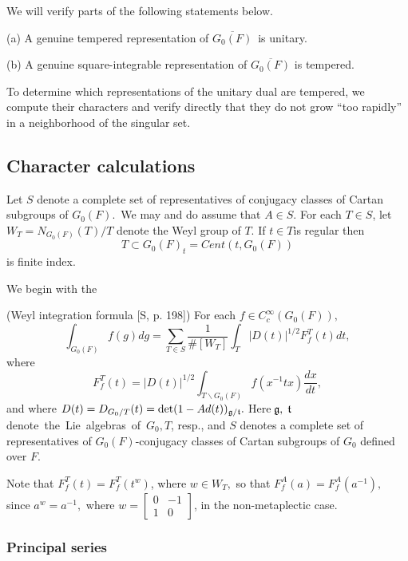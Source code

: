 We will verify parts of the following statements below.

\begin{conjecture}
(a) A genuine tempered representation of $\overline{G_0(F)}$\ is unitary.

(b) A genuine square-integrable representation of $\overline{G_0(F)}$ is
tempered.
\end{conjecture}

To determine which representations of the unitary dual are tempered, we
compute their characters and verify directly that they do not grow ``too
rapidly'' in a neighborhood of the singular set.

\subsection{Character calculations}

Let $S$ denote a complete set of representatives of conjugacy classes of
Cartan subgroups of $G_0(F)$.\ We may and do assume that $A\in S.$ For each $%
T\in S$, let $W_T=N_{G_0(F)}(T)/T$ denote the Weyl group of $T$. If $t\in T$is regular then 
\[
T\subset G_0(F)_t=Cent(t,G_0(F)) 
\]
is finite index.

We begin with the

\begin{lemma}
(Weyl integration formula [S, p. 198]) For each $f\in C_c^\infty (G_0(F)),$%
\[
\int_{G_0(F)}f(g)dg=\sum_{T\in S}\frac
1{\#[W_T]}\int_T|D(t)|^{1/2}F_f^T(t)dt,
\]
where 
\[
F_f^T(t)=|D(t)|^{1/2}\int_{T\backslash G_0(F)}f(x^{-1}tx)\frac{dx}{dt},
\]
and where $D(t)=D_{G_0/T}(t)=\det (1-Ad(t))_{{\frak g}/{\frak t}}.\;$Here$\;%
{\frak g},\;{\frak t}\;$denote\ the\ Lie\ algebras\ of\ $G_0,T$, resp., and $%
S$ denotes a complete set of representatives of $G_0(F)$-conjugacy classes
of Cartan subgroups of $G_0$ defined over $F$.
\end{lemma}

Note that $F_f^T(t)=F_f^T(t^w)$, where $w\in W_T,$ so that $%
F_f^A(a)=F_f^A(a^{-1}),$ since $a^w=a^{-1},$ where $w=\left[ 
\begin{array}{cc}
0 & -1 \\ 
1 & 0
\end{array}
\right] $, in the non-metaplectic case.

\subsubsection{Principal series}

